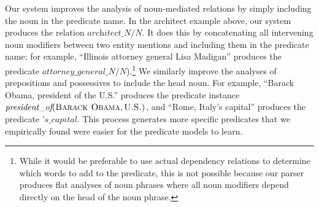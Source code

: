 \documentclass[11pt]{article}
\newcommand{\lexicalpredicate}[1]{\ensuremath{\textit{#1}}}
\newcommand{\entity}[1]{\ensuremath{\textsc{#1}}}
\begin{document}
Our system improves the analysis of noun-mediated relations by simply
including the noun in the predicate name. In the architect example
above, our system produces the relation
\lexicalpredicate{architect\_N/N}. It does this by
concatenating all intervening noun modifiers between two entity
mentions and including them in the predicate name; for example,
``Illinois attorney general Lisa Madigan'' produces the predicate
\lexicalpredicate{attorney\_general\_N/N}).\footnote{While it would be
preferable to use actual dependency relations to determine which words
to add to the predicate, this is not possible because our parser
produces flat analyses of noun phrases where all noun modifiers depend
directly on the head of the noun phrase.} We similarly improve the
analyses of prepositions and possessives to include the head noun. For
example, ``Barack Obama, president of the U.S.'' produces the
predicate instance $\lexicalpredicate{president\_of}(\entity{Barack
  Obama}, \entity{U.S.})$, and ``Rome, Italy's capital'' produces the
predicate \lexicalpredicate{'s\_capital}. This process generates more
specific predicates that we empirically found were easier for the
predicate models to learn.


\end{document}
